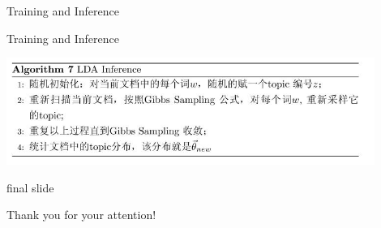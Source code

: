 \documentclass{beamer}
\begin{document}
\begin{CJK*}{UTF8}{gbsn}
\begin{frame}{Training and Inference}
\end{frame}


\begin{frame}{Training and Inference}

\begin{center}
	\includegraphics[width=0.9\textwidth]{picture/I.jpeg}
\end{center}
\end{frame}






\begin{frame}
 \begin{beamercolorbox}[wd=\paperwidth, ht=1.4cm,rounded=true,shadow=true]{final slide}
      \begin{center}
	{\huge Thank you for your attention!}
      \end{center}
 \end{beamercolorbox}
\end{frame}
\end{CJK*}
\end{document}
